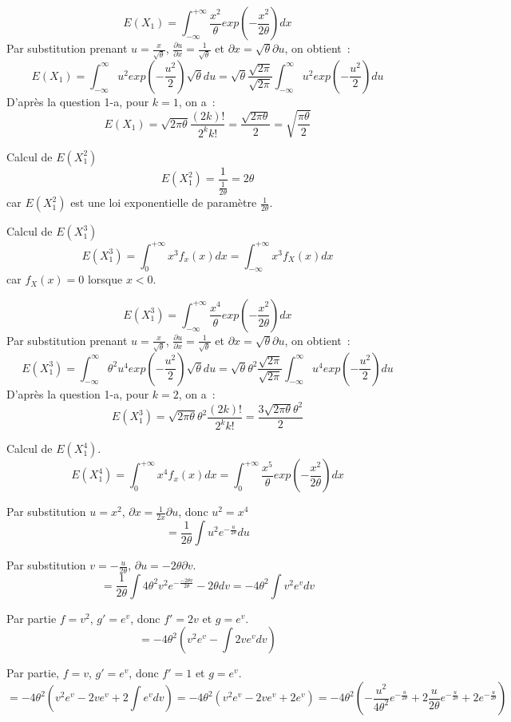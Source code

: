 \documentclass[]{book}
\theoremstyle{definition}
\begin{document}
$$
E(X_1) = \int_{-\infty}^{+\infty} \frac{x^2}{\theta} exp \left( -\frac{x^2}{2\theta}\right) dx
$$
Par substitution prenant $u = \frac{x}{\sqrt{\theta}}$, $\frac{\partial u}{\partial x} = \frac{1}{\sqrt{\theta}}$ et ${\partial x} = \sqrt{\theta}{\partial u}$, on obtient~:
$$
E(X_1) = \int_{-\infty}^{\infty} u^2 exp \left( -\frac{u^2}{2}\right) \sqrt{\theta} du = \sqrt{\theta} \frac{\sqrt{2\pi}}{\sqrt{2\pi}} \int_{-\infty}^{\infty} u^2 exp \left( -\frac{u^2}{2}\right)  du 
$$
D'apr\`es la question 1-a, pour $k=1$, on a~:
$$
E(X_1) = \sqrt{2\pi\theta}\frac{(2k)!}{2^k k!} = \frac{\sqrt{2\pi\theta}}{2} = \sqrt{\frac{\pi\theta}{2}}
$$

Calcul de $E(X_1^2)$
$$
E(X_1^2) = \frac{1}{\frac{1}{2\theta}} = {2\theta}
$$
car $E(X_1^2)$ est une loi exponentielle de param\`etre $\frac{1}{2\theta}$.


Calcul de $E(X_1^3)$
$$
E(X_1^3) = \int_{0}^{+\infty} x^3 f_{x}(x) dx = \int_{-\infty}^{+\infty} x^3 f_{X}(x) dx
$$
car $f_{X}(x) = 0$ lorsque $x < 0$.

$$
E(X_1^3) = \int_{-\infty}^{+\infty} \frac{x^4}{\theta} exp \left( -\frac{x^2}{2\theta}\right) dx
$$
Par substitution prenant $u = \frac{x}{\sqrt{\theta}}$, $\frac{\partial u}{\partial x} = \frac{1}{\sqrt{\theta}}$ et ${\partial x} = \sqrt{\theta}{\partial u}$, on obtient~:
$$
E(X_1^3) = \int_{-\infty}^{\infty} \theta^2 u^4 exp \left( -\frac{u^2}{2}\right) \sqrt{\theta} du = \sqrt{\theta}\theta^2 \frac{\sqrt{2\pi}}{\sqrt{2\pi}} \int_{-\infty}^{\infty} u^4 exp \left( -\frac{u^2}{2}\right)  du 
$$
D'apr\`es la question 1-a, pour $k=2$, on a~:
$$
E(X_1^3) = \sqrt{2\pi\theta}\theta^2\frac{(2k)!}{2^k k!} = \frac{3\sqrt{2\pi\theta}\theta^2}{2} 
$$

Calcul de $E(X_1^4)$.
$$
E(X_1^4) = \int_{0}^{+\infty} x^4 f_{x}(x) dx = \int_{0}^{+\infty} \frac{x^5}{\theta} exp \left( -\frac{x^2}{2\theta}\right) dx 
$$

Par substitution $u=x^2$, $\partial x = \frac{1}{2x}\partial u$, donc $u^2 = x^4$
$$
= \frac{1}{2\theta} \int u^2e^{-\frac{u}{2\theta}}  du
$$

Par substitution $v = -\frac{u}{2\theta}$, $\partial u = -{2\theta} \partial v$.
$$
= \frac{1}{2\theta} \int 4\theta^2 v^2 e^{-\frac{-2\theta v}{2\theta}}  -{2\theta} dv = -4\theta^2 \int v^2 e^{v} dv
$$

Par partie $f=v^2$, $g'=e^v$, donc $f'=2v$ et $g=e^v$.
$$
= -4\theta^2 \left(v^2e^{v} - \int 2ve^v dv \right)
$$

Par partie, $f=v$, $g'=e^v$, donc $f'=1$ et $g=e^v$.
$$
= -4\theta^2 \left(v^2e^{v} - 2ve^v + 2\int e^v dv \right) 
= -4\theta^2 \left(v^2e^{v} - 2ve^v + 2e^v  \right) 
= -4\theta^2 \left(-\frac{u^2}{4\theta^2} e^{-\frac{u}{2\theta}} + 2 \frac{u}{2\theta} e^{-\frac{u}{2\theta}} + 2 e^{-\frac{u}{2\theta}} \right)
$$
\end{document}
